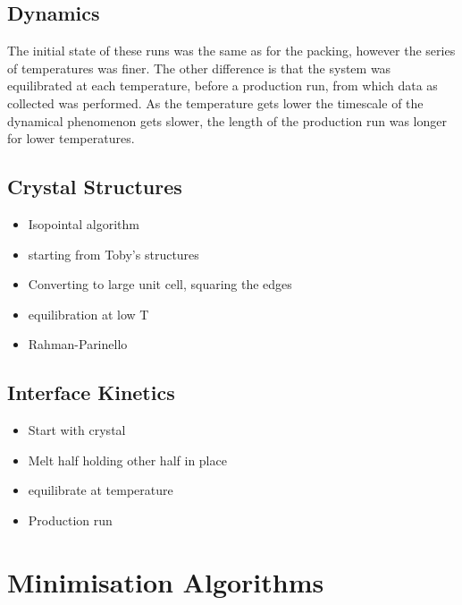 \subsection{Dynamics}

The initial state of these runs was the same as for the packing, however the series of temperatures was finer. The other difference is that the system was equilibrated at each temperature, before a production run, from which data as collected was performed. As the temperature gets lower the timescale of the dynamical phenomenon gets slower, the length of the production run was longer for lower temperatures.

\subsection{Crystal Structures}

\begin{itemize}
    \item Isopointal algorithm
    \item starting from Toby's structures
    \item Converting to large unit cell, squaring the edges
    \item equilibration at low T
    \item Rahman-Parinello
\end{itemize}

\subsection{Interface Kinetics}

\begin{itemize}
    \item Start with crystal
    \item Melt half holding other half in place
    \item equilibrate at temperature
    \item Production run
\end{itemize}

\section{Minimisation Algorithms}

